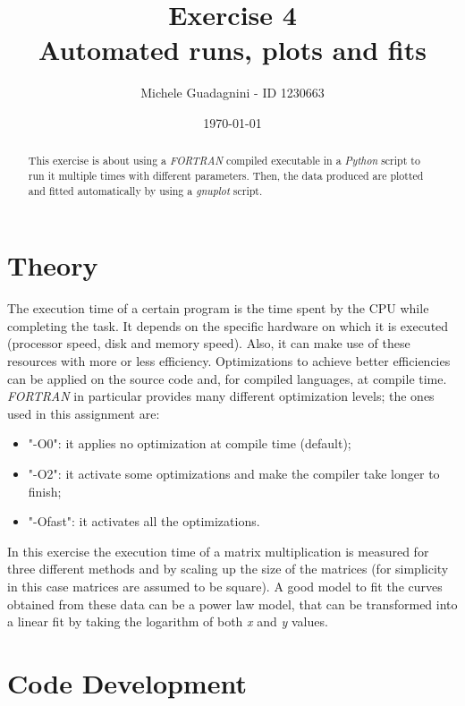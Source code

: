 \documentclass[11pt,a4paper]{article}
\author{Michele Guadagnini - ID 1230663}
\title{\textbf{Exercise 4 \\ Automated runs, plots and fits}}
\date{\today}
\begin{document}
\maketitle

\vspace{20pt}
\begin{abstract}
	This exercise is about using a \textit{FORTRAN} compiled executable in a \textit{Python} script to run it multiple times with different parameters. Then, the data produced are plotted and fitted automatically by using a \textit{gnuplot} script.
\end{abstract}

\section{Theory} %

The execution time of a certain program is the time spent by the CPU while completing the task.
It depends on the specific hardware on which it is executed (processor speed, disk and memory speed). Also, it can make use of these resources with more or less efficiency.
Optimizations to achieve better efficiencies can be applied on the source code and, for compiled languages, at compile time.
\textit{FORTRAN} in particular provides many different optimization levels; the ones used in this assignment are:
\begin{itemize}
	\item "-O0": it applies no optimization at compile time (default);
	\item "-O2": it activate some optimizations and make the compiler take longer to finish;
	\item "-Ofast": it activates all the optimizations.
\end{itemize}

In this exercise the execution time of a matrix multiplication is measured for three different methods and by scaling up the size of the matrices (for simplicity in this case matrices are assumed to be square).
A good model to fit the curves obtained from these data can be a power law model, that can be transformed into a linear fit by taking the logarithm of both \textit{x} and \textit{y} values.


\section{Code Development} %
\end{document}

